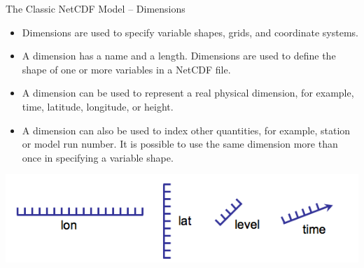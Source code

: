 \documentclass[compress,11pt,xcolor=svgnames,aspectratio=169]{beamer}
\begin{document}
\begin{frame}[fragile]{The Classic NetCDF Model -- Dimensions}

\begin{itemize}
\setlength\itemsep{0.3cm}

  \item Dimensions are used to specify variable shapes, grids, and coordinate systems.

  \item A dimension has a name and a length. Dimensions are used to define the shape of one or more variables in a NetCDF file.

  \item A dimension can be used to represent a real physical dimension, for example, time, latitude, longitude, or height.

  \item A dimension can also be used to index other quantities, for example, station or model run number. It is possible to use the same dimension more than once in specifying a variable shape.

\end{itemize}

\begin{center}
\includegraphics[scale=0.4]{fig/ncdim2}
\end{center}

\nocite{netcdf}

\end{frame}
\end{document}
